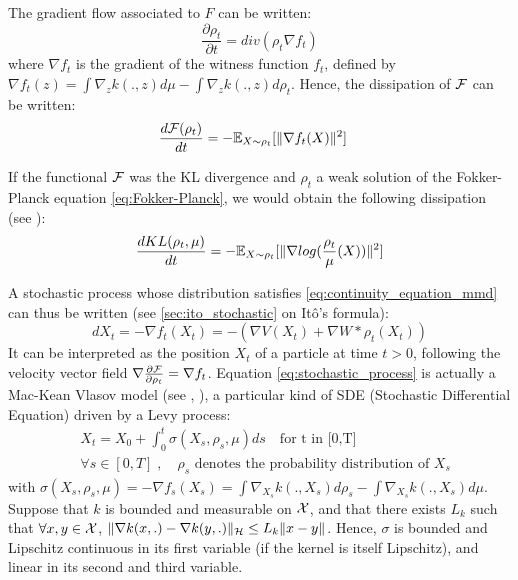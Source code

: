 \begin{proposition}\label{prop:mmd_flow} The gradient flow associated to $F$ can be written:
\begin{equation}\label{eq:continuity_equation_mmd}
\frac{\partial \rho_t}{\partial t}= div(\rho_t  \nabla f_t)
\end{equation}
 where $\nabla f_t$ is the gradient of the witness function $f_t$, defined by $\nabla f_t(z)= \int \nabla_{z}k(.,z) d\mu -  \int \nabla_{z}k(.,z) d\rho_t$. Hence, the dissipation of ${{\mathcal F}}$ can be written:  
 \begin{equation}
 \frac{d {{\mathcal F}}(\rho_t)}{dt}=-{{\mathbb E}}_{X \sim \rho_t}[\|\nabla f_t(X)\|^2]\quad
 \end{equation}

\end{proposition}
\begin{remark}
	If the functional ${{\mathcal F}}$ was the KL divergence and $\rho_t$ a weak solution of the Fokker-Planck equation \cref{eq:Fokker-Planck}, we would obtain the following dissipation (see \cite{wibisono2018sampling}):
	\begin{align}\label{eq:decreasing_mmd}
	\frac{d KL(\rho_t, \mu)}{dt}=-{{\mathbb E}}_{X \sim \rho_t}[\|\nabla log(\frac{\rho_t}{\mu}(X))\|^2]
	\end{align}
\end{remark}
A stochastic process whose distribution satisfies \cref{eq:continuity_equation_mmd} can thus be written (see \cref{sec:ito_stochastic} on Itô's formula):
\begin{equation}\label{eq:stochastic_process}
dX_t=-\nabla f_t(X_t) = - (\nabla V (X_t) + \nabla W * \rho_t(X_t))
\end{equation}
It can be interpreted as the position $X_t$ of a particle at time $t > 0$, following the velocity vector field $\nabla \frac{\partial{{{\mathcal F}}}}{\partial{\rho_t}}=\nabla f_t$.  Equation \eqref{eq:stochastic_process} is actually a Mac-Kean Vlasov model (see \cite{kac1956foundations}, \cite{mckean1966class}), a particular kind of SDE (Stochastic Differential Equation) driven by a Levy process:
\begin{align}\label{eq:theoretical_process}
&X_t=X_{0}+\int_{0}^t \sigma(X_s, \rho_s, \mu)ds \quad \text{for t in [0,T]}\\
&\forall s \in [0,T]\;,\quad \rho_s \text{ denotes the probability distribution of } X_s
\end{align}
with $\sigma(X_s, \rho_s, \mu)=-\nabla f_s(X_s)=\int \nabla_{X_s}k(.,X_s) d\rho_s -  \int \nabla_{X_s}k(.,X_s) d\mu$. Suppose that $k$ is bounded  and measurable on ${{\mathcal X}}$, and that there exists $L_k$ such that $\forall x,y \in {{\mathcal X}}$, $\|\nabla k(x,.)-\nabla k(y,.) \|_{{{\mathcal H}}}\le L_k \|x-y\|$. Hence, $\sigma$ is bounded and Lipschitz continuous in its first variable (if the kernel is itself Lipschitz), and linear in its second and third variable. 
